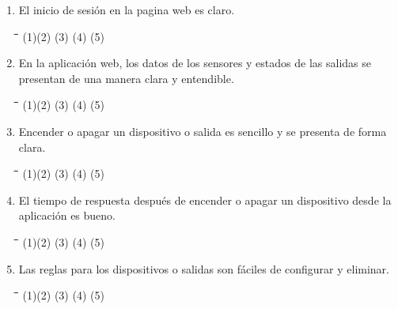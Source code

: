 \begin{appendix}
\begin{enumerate}
	\item El inicio de sesión en la pagina web es claro.
	
\begin{tabbing}
	\hspace{2cm}\=\hspace{2cm}\=\hspace{2cm}\=\hspace{2cm}\=\kill
	(1)\>(2)  \>(3)  \>(4)  \>(5) 
\end{tabbing} 

	\item En la aplicación web, los datos de los sensores y estados de las salidas se presentan de una manera clara y entendible.

\begin{tabbing}
	\hspace{2cm}\=\hspace{2cm}\=\hspace{2cm}\=\hspace{2cm}\=\kill
	(1)\>(2)  \>(3)  \>(4)  \>(5) \\
\end{tabbing} 
	
	\item Encender o apagar un dispositivo o salida es sencillo y se presenta de forma clara.
	
\begin{tabbing}
	\hspace{2cm}\=\hspace{2cm}\=\hspace{2cm}\=\hspace{2cm}\=\kill
	(1)\>(2)  \>(3)  \>(4)  \>(5) 
\end{tabbing} 

	\item El tiempo de respuesta después de encender o apagar un dispositivo desde la aplicación es bueno.

	\begin{tabbing}
		\hspace{2cm}\=\hspace{2cm}\=\hspace{2cm}\=\hspace{2cm}\=\kill
		(1)\>(2)  \>(3)  \>(4)  \>(5) 
	\end{tabbing} 

	\item Las reglas para los dispositivos o salidas son fáciles de configurar y eliminar.

\begin{tabbing}
	\hspace{2cm}\=\hspace{2cm}\=\hspace{2cm}\=\hspace{2cm}\=\kill
	(1)\>(2)  \>(3)  \>(4)  \>(5) 
\end{tabbing} 


\end{enumerate}
\end{appendix}
